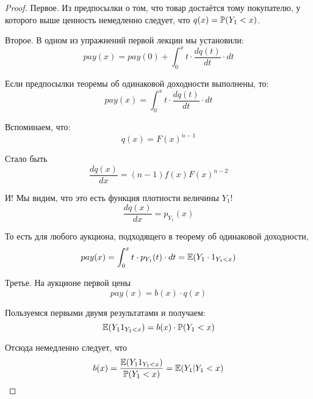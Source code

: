 \begin{proof}

Первое. Из предпосылки о том, что товар достаётся тому покупателю, у которого выше ценность немедленно следует, что $ q(x)=\P(Y_{1}<x) $.

Второе. В одном из упражнений первой лекции мы установили:
\begin{equation}
pay(x)=pay(0)+\int_{0}^{x}t \cdot \frac{dq(t)}{dt}\cdot dt
\end{equation}

Если предпосылки теоремы об одинаковой доходности выполнены, то:
\begin{equation}
pay(x)=\int_{0}^{x}t \cdot \frac{dq(t)}{dt}\cdot dt
\end{equation}


Вспоминаем, что:
\begin{equation}
q(x)=F(x)^{n-1}
\end{equation}

Стало быть
\begin{equation}
\frac{dq(x)}{dx}=(n-1)f(x)F(x)^{n-2}
\end{equation}

И! Мы видим, что это есть функция плотности величины $ Y_{1} $!
\begin{equation}
\frac{dq(x)}{dx}=p_{Y_{1}}(x)
\end{equation}

То есть для любого аукциона, подходящего в теорему об одинаковой доходности,
\begin{equation}
pay(x)=\int_{0}^{x}t \cdot p_{Y_{1}}(t)\cdot dt=\E(Y_{1}\cdot 1_{Y_{1}<x})
\end{equation}



Третье. На аукционе первой цены
\begin{equation}
pay(x)=b(x)\cdot q(x)
\end{equation}

Пользуемся первыми двумя результатами и получаем:
\begin{equation}
\E(Y_{1}1_{Y_{1}<x})=b(x)\cdot \P(Y_{1}<x)
\end{equation}

Отсюда немедленно следует, что
\begin{equation}
b(x)=\frac{\E(Y_{1}1_{Y_{1}<x})}{\P(Y_{1}<x)}=\E(Y_{1}|Y_{1}<x)
\end{equation}



\end{proof}







